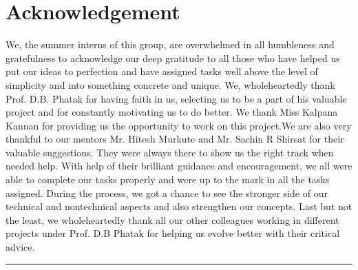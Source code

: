 \documentclass[a4paper, twosided, openany]{memoir}
\begin{document}
\newpage

\chapter*{Acknowledgement}
	We, the summer interns of this group, are overwhelmed in all humbleness and
gratefulness to acknowledge our deep gratitude to all those who have helped us put
our ideas to perfection and have assigned tasks well above the level of simplicity and
into something concrete and unique.
We, wholeheartedly thank Prof. D.B. Phatak for having faith in us, selecting us to be
a part of his valuable project and for constantly motivating us to do better.
We thank Miss Kalpana Kannan for providing us the opportunity to work on this
project.We are also very thankful to our mentors Mr. Hitesh Murkute and Mr. Sachin R Shirsat
for their valuable suggestions. They were always there to show us the right track when needed help.
With help of their brilliant guidance and encouragement, we all were able to complete
our tasks properly and were up to the mark in all the tasks assigned. During the
process, we got a chance to see the stronger side of our technical and nontechnical
aspects and also strengthen our concepts.
Last but not the least, we wholeheartedly thank all our other colleagues working in
different projects under Prof. D.B Phatak for helping us evolve better with their critical advice.\newline
\par\fancybreak{$***$}\par
\newpage

\tableofcontents

\mainmatter










\end{document}

